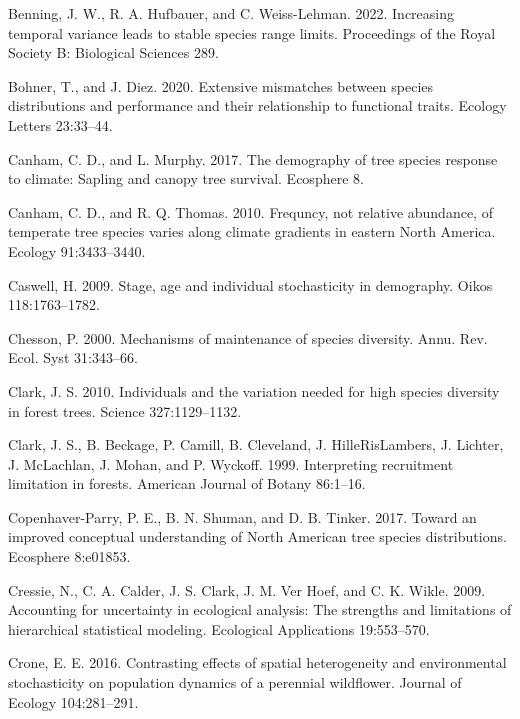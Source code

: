 \documentclass[12pt]{article}
\newlength{\cslhangindent}
\newenvironment{cslreferences}%
  {\setlength{\parindent}{0pt}%
  \everypar{\setlength{\hangindent}{\cslhangindent}}\ignorespaces}%
  {\par}
\begin{document}
\hypertarget{refs}{}
\begin{cslreferences}
\leavevmode\hypertarget{ref-Benning2022}{}%
Benning, J. W., R. A. Hufbauer, and C. Weiss-Lehman. 2022. Increasing
temporal variance leads to stable species range limits. Proceedings of
the Royal Society B: Biological Sciences 289.

\leavevmode\hypertarget{ref-bohner2020}{}%
Bohner, T., and J. Diez. 2020. Extensive mismatches between species
distributions and performance and their relationship to functional
traits. Ecology Letters 23:33--44.

\leavevmode\hypertarget{ref-Canham2017}{}%
Canham, C. D., and L. Murphy. 2017. The demography of tree species
response to climate: Sapling and canopy tree survival. Ecosphere 8.

\leavevmode\hypertarget{ref-Canham2010}{}%
Canham, C. D., and R. Q. Thomas. 2010. Frequncy, not relative abundance,
of temperate tree species varies along climate gradients in eastern
North America. Ecology 91:3433--3440.

\leavevmode\hypertarget{ref-Caswell2009}{}%
Caswell, H. 2009. Stage, age and individual stochasticity in demography.
Oikos 118:1763--1782.

\leavevmode\hypertarget{ref-Chesson2000a}{}%
Chesson, P. 2000. Mechanisms of maintenance of species diversity. Annu.
Rev. Ecol. Syst 31:343--66.

\leavevmode\hypertarget{ref-Clark2010}{}%
Clark, J. S. 2010. Individuals and the variation needed for high species
diversity in forest trees. Science 327:1129--1132.

\leavevmode\hypertarget{ref-Clark1999a}{}%
Clark, J. S., B. Beckage, P. Camill, B. Cleveland, J. HilleRisLambers,
J. Lichter, J. McLachlan, J. Mohan, and P. Wyckoff. 1999. Interpreting
recruitment limitation in forests. American Journal of Botany 86:1--16.

\leavevmode\hypertarget{ref-CopenhaverParry2017}{}%
Copenhaver-Parry, P. E., B. N. Shuman, and D. B. Tinker. 2017. Toward an
improved conceptual understanding of North American tree species
distributions. Ecosphere 8:e01853.

\leavevmode\hypertarget{ref-Cressie2009}{}%
Cressie, N., C. A. Calder, J. S. Clark, J. M. Ver Hoef, and C. K. Wikle.
2009. Accounting for uncertainty in ecological analysis: The strengths
and limitations of hierarchical statistical modeling. Ecological
Applications 19:553--570.

\leavevmode\hypertarget{ref-Crone2016}{}%
Crone, E. E. 2016. Contrasting effects of spatial heterogeneity and
environmental stochasticity on population dynamics of a perennial
wildflower. Journal of Ecology 104:281--291.


\end{cslreferences}
\end{document}

